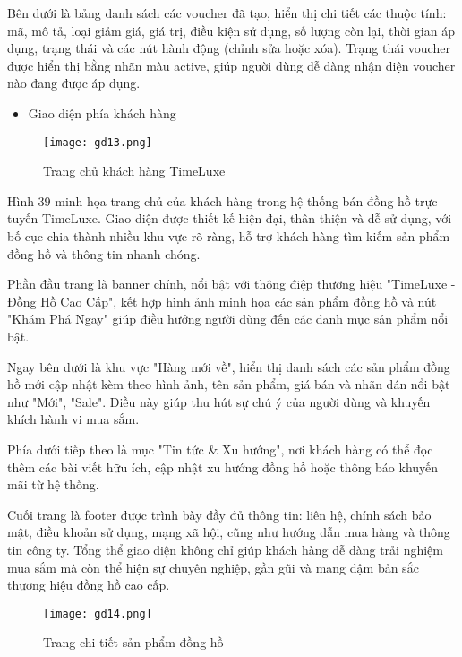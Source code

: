 Bên dưới là bảng danh sách các voucher đã tạo, hiển thị chi tiết các thuộc tính: mã, mô tả, loại giảm giá, giá trị, điều kiện sử dụng, số lượng còn lại, thời gian áp dụng, trạng thái và các nút hành động (chỉnh sửa hoặc xóa). Trạng thái voucher được hiển thị bằng nhãn màu active, giúp người dùng dễ dàng nhận diện voucher nào đang được áp dụng.

\begin{itemize}
    \item Giao diện phía khách hàng
\end{itemize}

\begin{figure}[H]
  \centering
  \texttt{[image: gd13.png]}
  \caption{Trang chủ khách hàng TimeLuxe}
  \label{fig:customer-home}
\end{figure}

Hình 39 minh họa trang chủ của khách hàng trong hệ thống bán đồng hồ trực tuyến TimeLuxe. Giao diện được thiết kế hiện đại, thân thiện và dễ sử dụng, với bố cục chia thành nhiều khu vực rõ ràng, hỗ trợ khách hàng tìm kiếm sản phẩm đồng hồ và thông tin nhanh chóng.

Phần đầu trang là banner chính, nổi bật với thông điệp thương hiệu "TimeLuxe - Đồng Hồ Cao Cấp", kết hợp hình ảnh minh họa các sản phẩm đồng hồ và nút "Khám Phá Ngay" giúp điều hướng người dùng đến các danh mục sản phẩm nổi bật.

Ngay bên dưới là khu vực "Hàng mới về", hiển thị danh sách các sản phẩm đồng hồ mới cập nhật kèm theo hình ảnh, tên sản phẩm, giá bán và nhãn dán nổi bật như "Mới", "Sale". Điều này giúp thu hút sự chú ý của người dùng và khuyến khích hành vi mua sắm.

Phía dưới tiếp theo là mục "Tin tức & Xu hướng", nơi khách hàng có thể đọc thêm các bài viết hữu ích, cập nhật xu hướng đồng hồ hoặc thông báo khuyến mãi từ hệ thống.

Cuối trang là footer được trình bày đầy đủ thông tin: liên hệ, chính sách bảo mật, điều khoản sử dụng, mạng xã hội, cũng như hướng dẫn mua hàng và thông tin công ty. Tổng thể giao diện không chỉ giúp khách hàng dễ dàng trải nghiệm mua sắm mà còn thể hiện sự chuyên nghiệp, gần gũi và mang đậm bản sắc thương hiệu đồng hồ cao cấp.

\begin{figure}[H]
  \centering
  \texttt{[image: gd14.png]}
  \caption{Trang chi tiết sản phẩm đồng hồ}
  \label{fig:customer-product-detail}
\end{figure}

